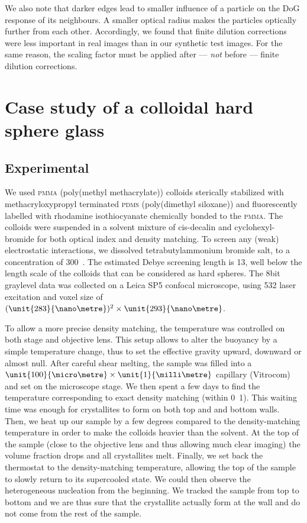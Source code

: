 \documentclass[8.5pt,twoside,twocolumn]{article}
\begin{document}
We also note that darker edges lead to smaller influence of a particle on the DoG response of its neighbours. A smaller optical radius makes the particles optically further from each other. Accordingly, we found that finite dilution corrections were less important in real images than in our synthetic test images. For the same reason, the scaling factor must be applied after --- \emph{not} before --- finite dilution corrections.


\section{Case study of a colloidal hard sphere glass}
\label{sec:yon6}

\subsection{Experimental}
We used \textsc{pmma} (poly(methyl methacrylate)) colloids sterically stabilized with methacryloxypropyl terminated \textsc{pdms} (poly(dimethyl siloxane)) and fluorescently labelled with rhodamine isothiocyanate chemically bonded to the \textsc{pmma}. The colloids were suspended in a solvent mixture of cis-decalin and cyclohexyl-bromide for both optical index and density matching. To screen any (weak) electrostatic interactions, we dissolved tetrabutylammonium bromide salt, to a concentration of \unit{300}{\nano\mole\per\liter}~\citep{royall2005}. The estimated Debye screening length is \unit{13}{\nano\metre}, well below the length scale of the colloids that can be considered as hard spheres. The \unit{8}{bit} graylevel data was collected on a Leica SP5 confocal microscope, using \unit{532}{\nano\meter} laser excitation and voxel size of $(\unit{283}{\nano\metre})^2\times\unit{293}{\nano\metre}$.

To allow a more precise density matching, the temperature was controlled on both stage and objective lens. This setup allows to alter the buoyancy by a simple temperature change, thus to set the effective gravity upward, downward or almost null. After careful shear melting, the sample was filled into a $\unit{100}{\micro\metre}\times\unit{1}{\milli\metre}$ capillary (Vitrocom) and set on the microscope stage. We then spent a few days to find the temperature corresponding to exact density matching (within \unit{0.1}{\celsius}). This waiting time was enough for crystallites to form on both top and and bottom walls. Then, we heat up our sample by a few degrees compared to the density-matching temperature in order to make the colloids heavier than the solvent. At the top of the sample (close to the objective lens and thus allowing much clear imaging) the volume fraction drops and all crystallites melt. Finally, we set back the thermostat to the density-matching temperature, allowing the top of the sample to slowly return to its supercooled state. We could then observe the heterogeneous nucleation from the beginning. We tracked the sample from top to bottom and we are thus sure that the crystallite actually form at the wall and do not come from the rest of the sample.
\end{document}
